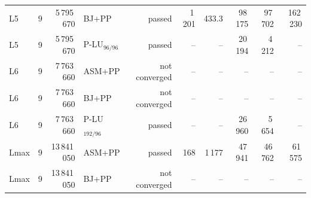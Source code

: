 \begin{tabular}{lrrlrrrrrr}
L5 & 9 & 5\,795\,670 & BJ+PP & passed & 1\,201 & 433.3 & 98\,175 & 97\,702 & 162\,230\\
L5 & 9 & 5\,795\,670 & P-LU$_{96/96}$ & passed & -- & -- & 20\,194 & 4\,212 & --\\
L6 & 9 & 7\,763\,660 & ASM+PP & not converged & -- & -- & -- & -- & --\\
L6 & 9 & 7\,763\,660 & BJ+PP & not converged & -- & -- & -- & -- & --\\
L6 & 9 & 7\,763\,660 & P-LU$_{192/96}$ & passed & -- & -- & 26\,960 & 5\,654 & --\\
Lmax & 9 & 13\,841\,050 & ASM+PP & passed & 168 & 1\,177 & 47\,941 & 46\,762 & 61\,575\\
Lmax & 9 & 13\,841\,050 & BJ+PP & not converged & -- & -- & -- & -- & --\\
\bottomrule
\end{tabular}
